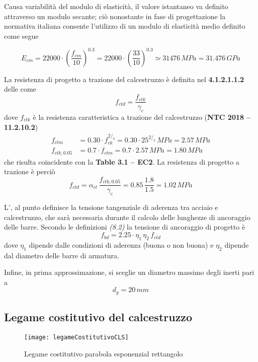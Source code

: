 Causa variabilit\`a del modulo di elasticit\`a, il valore istantaneo va definito attraverso un modulo secante; ci\`o nonostante in fase di progettazione la normativa italiana consente l'utilizzo di un modulo di elasticit\`a medio definito come segue

\[
E_{cm} = 22000 \cdot \left(\dfrac{f_{cm}}{10}\right)^{0.3} = 22000\cdot\left(\dfrac{33}{10}\right)^{0.3} \simeq 31476\,MPa = 31.476\,GPa
\]

La resistenza di progetto a trazione del calcestruzzo \`e definita nel \textbf{4.1.2.1.1.2} delle \ntc come 
\[
f_{ctd} = \dfrac{f_{ctk}}{\gamma_c}
\]
dove $f_{ctk}$ \`e la resistenza caratteristica a trazione del calcestruzzo (\textbf{NTC 2018 -- 11.2.10.2})
\begin{align}
	f_{ctm} &= 0.30\cdot f_{ck}^{2/_3} = 0.30\cdot 25^{2/_3}\,MPa = 2.57\,MPa\label{eq:fctm}\\
	f_{ctk,0.05} &= 0.7\cdot f_{ctm} = 0.7\cdot 2.57\,MPa = 1.80\,MPa\label{eq:fctk005}
\end{align}
che risulta coincidente con la \textbf{Table 3.1 -- EC2}. La resistenza di progetto a trazione \`e perci\`o
\begin{equation}
	\label{eq:fctd}
	f_{ctd} = \alpha_{ct}\,\dfrac{f_{ctk,0.05}}{\gamma_c} = 0.85\,\dfrac{1.8}{1.5} = 1.02\,MPa
\end{equation}

L'\ec, al punto \textbf{} definisce la tensione tangenziale di aderenza tra acciaio e calcestruzzo, che sar\`a necessaria durante il calcolo delle lunghezze di ancoraggio delle barre. Secondo le definizioni \textit{(8.2)} la tensione di ancoraggio di progetto è
\begin{equation}
	\label{eq:fbd}
	f_{bd} = 2.25\cdot\eta_1\,\eta_2\,f_{ctd}
\end{equation}
dove $\eta_1$ dipende dalle condizioni di aderenza (buona o non buona) e $\eta_2$ dipende dal diametro delle barre di armatura.

Infine, in prima approssimazione, si sceglie un diametro massimo degli inerti pari a
\[
    d_g = 20\,mm
\]

\subsection{Legame costitutivo del calcestruzzo}

\begin{figure}
    \centering
	\texttt{[image: legameCostitutivoCLS]}
	\caption{Legame costitutivo parabola esponenzial rettangolo}
	\label{fig:legameCostitutivoCLS}
\end{figure}

